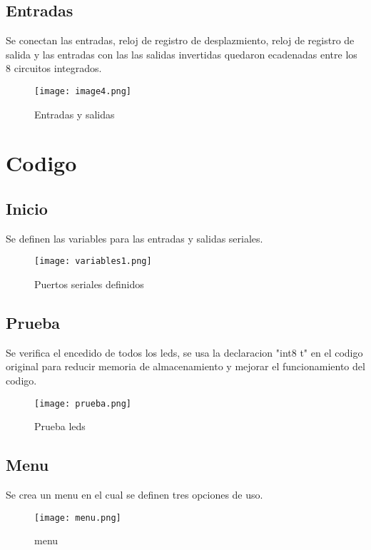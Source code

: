 \documentclass{article}
\begin{document}
\subsection{Entradas}
Se conectan las entradas, reloj de registro de desplazmiento, reloj de registro de salida y las entradas con las las salidas invertidas quedaron ecadenadas entre los 8 circuitos integrados.\cite{datasheet}
    \begin{figure}[h]
    \texttt{[image: image4.png]}
    \centering
    \caption{Entradas y salidas}
    \label{fig:image4}
    \end{figure}

\section{Codigo}
\label{Elaboracion}
\subsection{Inicio}
Se definen las variables para las entradas y salidas seriales.
    \begin{figure}[h]
    \texttt{[image: variables1.png]}
    \centering
    \caption{Puertos seriales definidos}
    \label{fig:variables1}
    \end{figure}

\subsection{Prueba}
Se verifica el encedido de todos los leds, se usa la declaracion "int8 t" en el codigo original para reducir memoria de almacenamiento y mejorar el funcionamiento del codigo.
    \begin{figure}[h]
    \texttt{[image: prueba.png]}
    \centering
    \caption{Prueba leds}
    \label{fig:prueba}
    \end{figure}

\subsection{Menu}
Se crea un menu en el cual se definen tres opciones de uso.
    \begin{figure}[h]
    \texttt{[image: menu.png]}
    \centering
    \caption{menu}
    \label{fig:menu}
    \end{figure}
\end{document}
